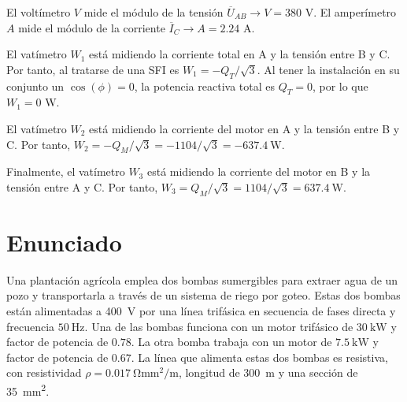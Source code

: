 El voltímetro $V$ mide el módulo de la tensión
$\overline{U}_{AB}\rightarrow V={380}$ {V}. El amperímetro $A$ mide el
módulo de la corriente $\overline{I}_C\rightarrow A={2.24}$ {A}. 

El vatímetro $W_1$ está midiendo la corriente total en A y la tensión entre B y C. Por tanto, al tratarse de una SFI es $W_1 = -Q_T/\sqrt{3}$. Al tener la instalación en su conjunto un
$\cos(\phi)=0$, la potencia reactiva total es $Q_T=0$, por lo que
$W_1=0$ W.

\vspace{3mm}

El vatímetro $W_2$ está midiendo la corriente del motor en A y la tensión entre B y C. Por tanto, $W_2 = -Q_M/\sqrt{3} =-1104/\sqrt{3}=\qty{-637.4}{\watt}$.

  \vspace{3mm}

Finalmente, el vatímetro $W_3$  está midiendo la corriente del motor en B y la tensión entre A y C. Por tanto, $W_3 = Q_M/\sqrt{3} = 1104/\sqrt{3}= \qty{637.4}{\watt}$.


 \section{Enunciado}

 Una plantación agrícola emplea dos bombas sumergibles para extraer
 agua de un pozo y transportarla a través de un sistema de riego por
 goteo. Estas dos bombas están alimentadas a \SI{400}{\volt} por una
 línea trifásica en secuencia de fases directa y frecuencia
 $\SI{50}{\hertz}$. Una de las bombas funciona con un motor trifásico
 de $\SI{30}{\kilo\watt}$ y factor de potencia de $0.78$. La otra bomba
 trabaja con un motor de $\SI{7.5}{\kilo\watt}$ y factor de potencia
 de $0.67$.  La línea que alimenta estas dos bombas es resistiva, con
 resistividad $\rho = \SI{0.017}{\ohm\milli\meter\squared\per\meter}$,
 longitud de \SI{300}{m} y una sección de
 \SI{35}{\milli\meter\squared}.
 
